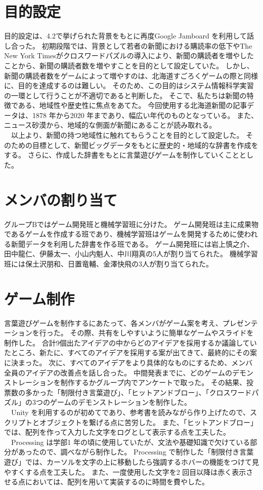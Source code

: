 \section{目的設定}
目的設定は、4.2で挙げられた背景をもとに再度Google Jamboard を利用して話し合った。
初期段階では、背景として若者の新聞における購読率の低下やThe New York Timesがクロスワードパズルの導入により、新聞の購読者を増やしたことから、新聞の購読者数を増やすことを目的として設定していた。
しかし、新聞の購読者数をゲームによって増やすのは、北海道すごろくゲームの際と同様に、目的を達成するのは難しい。
そのため、この目的はシステム情報科学実習の一環として行うことが不適切であると判断した。
そこで、私たちは新聞の特徴である、地域性や歴史性に焦点をあてた。
今回使用する北海道新聞の記事データは、1878 年から2020 年まであり、幅広い年代のものとなっている。
また、ニュース砂漠から、地域的な側面が新聞にあることが読み取れる。\\
　以上より、新聞の持つ地域性に触れてもらうことを目的として設定した。
そのための目標として、新聞ビッグデータをもとに歴史的・地域的な辞書を作成をする。
さらに、作成した辞書をもとに言葉遊びゲームを制作していくこととした。

\section{メンバの割り当て}
グループBではゲーム開発班と機械学習班に分けた。
ゲーム開発班は主に成果物であるゲームを作成する班であり、機械学習班はゲームを開発するために使われる新聞データを利用した辞書を作る班である。
ゲーム開発班には岩上慎之介、田中龍仁、伊藤太一、小山内魁人、中川翔真の5人が割り当てられた。
機械学習班には保土沢朋和、日置竜輔、金澤快飛の3人が割り当てられた。

\section{ゲーム制作}
言葉遊びゲームを制作するにあたって、各メンバがゲーム案を考え、プレゼンテーションを行った。
その際、共有をしやすいように簡単なゲームやスライドを制作した。
合計9個出たアイデアの中からどのアイデアを採用するか議論していたところ、新たに、すべてのアイデアを採用する案が出てきて、最終的にその案に決まった。
次に、すべてのアイデアをより具体的なものにするため、メンバ全員のアイデアの改善点を話し合った。
中間発表までに、どのゲームのデモンストレーションを制作するかグループ内でアンケートで取った。
その結果、投票数の多かった「制限付き言葉遊び」、「ヒットアンドブロー」、「クロスワードパズル」の3つのゲームのデモンストレーションを制作した。\\
　Unity を利用するのが初めてであり、参考書を読みながら作り上げたので、スクリプトとオブジェクトを繋げる点に苦労した。
また、「ヒットアンドブロー」では、配列を作って入力した文字をログとして表示する点を工夫した。\\
　Processing は学部1 年の頃に使用していたが、文法や基礎知識で欠けている部分があったので、調べながら制作した。
Processing で制作した「制限付き言葉遊び」では、カーソルを文字の上に移動したら強調するホバーの機能をつけて見やすくする点を工夫した。
また、一度使用した文字を2 回目以降は赤く表示させる点においては、配列を用いて実装するのに時間を費やした。

